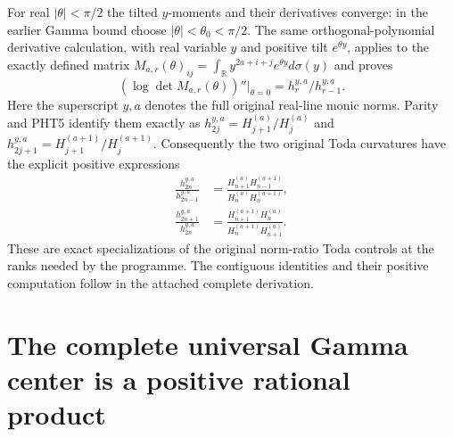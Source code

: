 \documentclass[11pt,a4paper]{article}
\begin{document}
For real $|\theta|<\pi/2$ the tilted $y$-moments and their
derivatives converge: in the earlier Gamma bound choose
$|\theta|<\theta_0<\pi/2$. The same orthogonal-polynomial
derivative calculation, with real variable $y$ and positive
tilt $e^{\theta y}$, applies to the exactly defined matrix
$M_{a,r}(\theta)_{ij}=\int_{\mathbb R}y^{2a+i+j}
e^{\theta y}d\sigma(y)$ and proves
\[
 (\log\det M_{a,r}(\theta))''\big|_{\theta=0}
   =h_r^{y,a}/h_{r-1}^{y,a}.
\tag{PHT18}
\]
Here the superscript $y,a$ denotes the full original real-line
monic norms. Parity and PHT5 identify them exactly as
$h_{2j}^{y,a}=H_{j+1}^{(a)}/H_j^{(a)}$ and
$h_{2j+1}^{y,a}=H_{j+1}^{(a+1)}/H_j^{(a+1)}$.
Consequently the two original Toda curvatures have the explicit
positive expressions
\[
\begin{aligned}
 \frac{h_{2n}^{y,a}}{h_{2n-1}^{y,a}}
 &=\frac{H_{n+1}^{(a)}H_{n-1}^{(a+1)}}
        {H_n^{(a)}H_n^{(a+1)}},\\
 \frac{h_{2n+1}^{y,a}}{h_{2n}^{y,a}}
 &=\frac{H_{n+1}^{(a+1)}H_n^{(a)}}
        {H_n^{(a+1)}H_{n+1}^{(a)}}.
\end{aligned}\tag{PHT19}
\]
These are exact specializations of the original norm-ratio
Toda controls at the ranks needed by the programme. The
contiguous identities and their positive computation follow
in the attached complete derivation.



\section{The complete universal Gamma center is a positive rational product}
\end{document}
